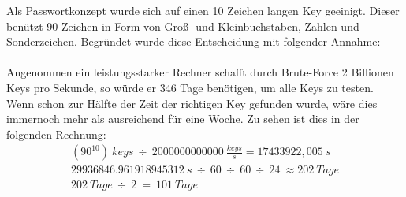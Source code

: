 \documentclass[a4paper,11pt,singlespacing]{article}
\begin{document}
    	    	Als Passwortkonzept wurde sich auf einen 10 Zeichen langen Key geeinigt. Dieser benützt 90 Zeichen in Form von Groß- und Kleinbuchstaben, Zahlen und Sonderzeichen. Begründet wurde diese Entscheidung mit folgender Annahme: \\\\
		Angenommen ein leistungsstarker Rechner schafft durch Brute-Force 2 Billionen Keys pro Sekunde, so würde er 346 Tage benötigen, um alle Keys zu testen.  Wenn schon zur Hälfte der Zeit der richtigen Key gefunden wurde, wäre dies immernoch mehr als ausreichend für eine Woche. Zu sehen ist dies in der folgenden Rechnung:
		\begin{eqnarray}
			(90^{10})\ keys\ \div\ 2000000000000\ \frac{keys}{s} =  17433922,005\ s\\
			29936846.961918945312\ s\ \div\ 60\ \div\ 60\ \div\ 24\ \approx 202 \ Tage\\
			202\ Tage\ \div\ 2\ =\ 101\ Tage
		\end{eqnarray}\\

    	
\end{document}
